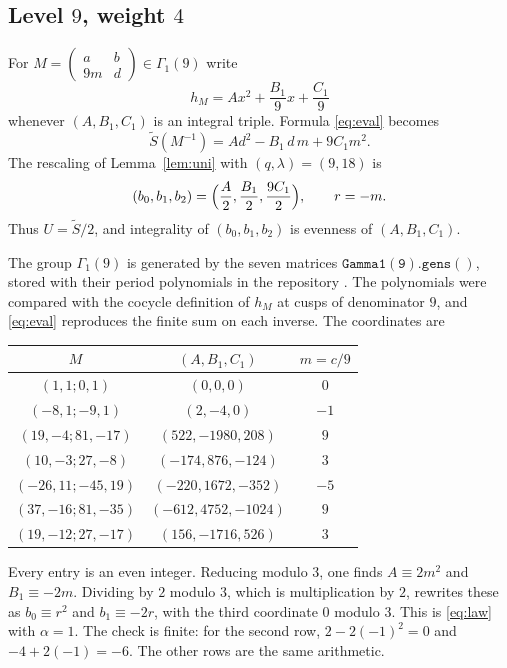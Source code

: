 \documentclass[11pt]{article}
\theoremstyle{remark}
\newcommand{\tS}{\widetilde{S}}
\begin{document}
\subsection{Level \(9\), weight \(4\)}
\label{sec:9}

For \(M=\begin{pmatrix}a&b\\9m&d\end{pmatrix}\in\Gamma_1(9)\) write
\[
h_M=Ax^2+\frac{B_1}{9}x+\frac{C_1}{9}
\]
whenever \((A,B_1,C_1)\) is an integral triple.
Formula \eqref{eq:eval} becomes
\[
\tS(M^{-1})=Ad^2-B_1\,d\,m+9C_1 m^2.
\]
The rescaling of Lemma~\ref{lem:uni} with \((q,\lambda)=(9,18)\) is
\[
(b_0,b_1,b_2)=\Bigl(\frac{A}{2},\frac{B_1}{2},\frac{9C_1}{2}\Bigr),\qquad r=-m.
\]
Thus \(U=\tS/2\), and integrality of \((b_0,b_1,b_2)\) is evenness of \((A,B_1,C_1)\).

The group \(\Gamma_1(9)\) is generated by the seven matrices \(\mathtt{Gamma1(9).gens()}\), stored with their period polynomials in the repository \cite{NFDS}.
The polynomials were compared with the cocycle definition of \(h_M\) at cusps of denominator \(9\), and \eqref{eq:eval} reproduces the finite sum on each inverse.
The coordinates are

\begin{center}
\begin{tabular}{ccc}
\hline
\(M\) & \((A,B_1,C_1)\) & \(m=c/9\) \\
\hline
\((1,1;0,1)\) & \((0,0,0)\) & \(0\) \\
\((-8,1;-9,1)\) & \((2,-4,0)\) & \(-1\) \\
\((19,-4;81,-17)\) & \((522,-1980,208)\) & \(9\) \\
\((10,-3;27,-8)\) & \((-174,876,-124)\) & \(3\) \\
\((-26,11;-45,19)\) & \((-220,1672,-352)\) & \(-5\) \\
\((37,-16;81,-35)\) & \((-612,4752,-1024)\) & \(9\) \\
\((19,-12;27,-17)\) & \((156,-1716,526)\) & \(3\) \\
\hline
\end{tabular}
\end{center}

Every entry is an even integer.
Reducing modulo \(3\), one finds \(A\equiv 2m^2\) and \(B_1\equiv -2m\).
Dividing by \(2\) modulo \(3\), which is multiplication by \(2\), rewrites these as \(b_0\equiv r^2\) and \(b_1\equiv -2r\), with the third coordinate \(0\) modulo \(3\).
This is \eqref{eq:law} with \(\alpha=1\).
The check is finite: for the second row, \(2-2(-1)^2=0\) and \(-4+2(-1)=-6\).
The other rows are the same arithmetic.
\end{document}
